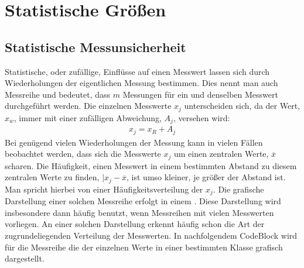 \documentclass[letterpaper,10pt,english]{jupyterBook}
\begin{document}
\sphinxstepscope


\section{Statistische Größen}
\label{\detokenize{content/1_Mittelwert_StdAbw:statistische-groszen}}\label{\detokenize{content/1_Mittelwert_StdAbw::doc}}

\subsection{Statistische Messunsicherheit}
\label{\detokenize{content/1_Mittelwert_StdAbw:statistische-messunsicherheit}}
\sphinxAtStartPar
Statistische, oder zufällige, Einflüsse auf einen Messwert lassen sich durch Wiederholungen der eigentlichen Messung bestimmen. Dies nennt man auch Messreihe und bedeutet, dass \(m\) Messungen für ein und denselben Messwert durchgeführt werden. Die einzelnen Messwerte \(x_j\) unterscheiden sich, da der  Wert, \(x_w\), immer mit einer zufälligen Abweichung, \(A_j\),  versehen wird:
\begin{equation*}
\begin{split}x_j = x_R + A_j\end{split}
\end{equation*}
\sphinxAtStartPar
Bei genügend vielen Wiederholungen der Messung kann in vielen Fällen beobachtet werden, dass sich die Messwerte \(x_j\) um einen zentralen Werte, \(\overline x\) scharen. Die Häufigkeit, einen Messwert in einem bestimmten Abstand zu diesem zentralen Werte zu finden, \(|x_j - \overline x\), ist umso kleiner, je größer der Abstand ist. Man spricht hierbei von einer Häufigkeitsverteilung der \(x_j\). Die grafische Darstellung einer solchen Messreihe erfolgt in einem . Diese Darstellung wird insbesondere dann häufig benutzt, wenn Messreihen mit vielen Messwerten vorliegen. An einer solchen Darstellung erkennt häufig schon die Art der zugrundeliegenden Verteilung der Messwerten. In nachfolgendem Code\sphinxhyphen{}Block wird für die Messreihe die  der einzelnen Werte in einer bestimmten Klasse grafisch dargestellt.
\end{document}
